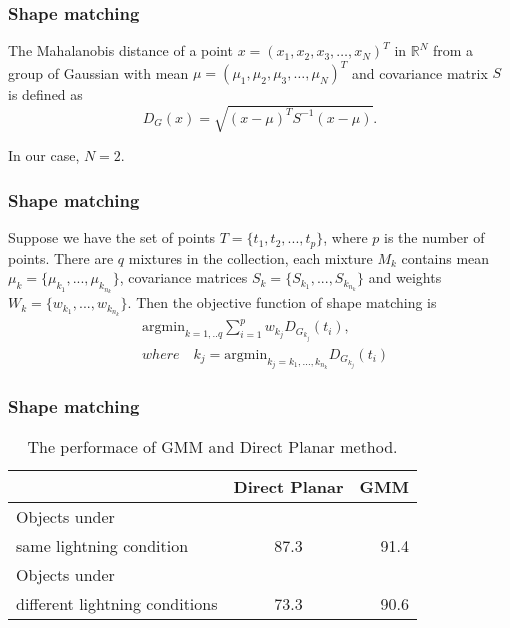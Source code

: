 \documentclass{beamer}
\begin{document}
\begin{frame}
\frametitle{Shape matching}
The Mahalanobis distance of a point $x = ( x_1, x_2, x_3, \dots, x_N )^T$ in $\mathbb{R}^N$ from a group of Gaussian with mean $\mu = ( \mu_1, \mu_2, \mu_3, \dots , \mu_N )^T$ and covariance matrix $S$ is defined as
\begin{equation}
D_G(x) = \sqrt{(x - \mu)^T S^{-1} (x-\mu)}. 
\end{equation}

In our case, $N=2$.

\end{frame}

\begin{frame}
\frametitle{Shape matching}
Suppose we have the set of points $T=\{t_1,t_2,...,t_p\}$, where $p$ is the number of points. There are $q$ mixtures in the collection, each mixture $M_k$ contains mean $\mu_k = \{\mu_{k_1},...,\mu_{k_{n_k}}\}$, covariance matrices $S_k = \{S_{k_1},...,S_{k_{n_k}} \}$ and weights $W_k=\{w_{k_1},...,w_{k_{n_k}} \}$. Then the objective function of shape matching is 
\begin{equation}
\begin{split}
& \mathrm{argmin}_{k=1,..q}  \sum_{i=1}^{p} w_{k_j} D_{G_{k_j}}(t_i),\\
& where \quad k_j = \mathrm{argmin}_{k_j=k_1,...,k_{n_k}} D_{G_{k_j}}(t_i)
\end{split}
\end{equation}
\end{frame}

\begin{frame}
\frametitle{Shape matching}
\begin{table}
\begin{center}
  \begin{tabular}{ l | c | r }
    \hline
     & Direct Planar & GMM \\ \hline
    
    Objects under \\ same lightning condition & 87.3 & 91.4 \\ \hline
    Objects under \\ different lightning conditions & 73.3 & 90.6 \\ 
    \hline
  \end{tabular}
\end{center}
\caption{The performace of GMM and Direct Planar method. }
\label{t:3}
\end{table}
\end{frame}
\end{document}
